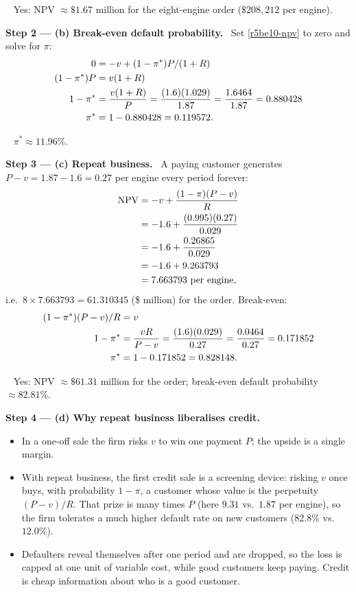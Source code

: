 \documentclass[11pt,a4paper]{article}
\newcommand{\step}[2]{\par\medskip\noindent\textbf{Step #1 --- #2.}~}
\newcommand{\answer}[1]{\par\smallskip\noindent\fbox{\textbf{Answer #1.}}~}
\begin{document}
\answer{(a)} Yes: NPV $\approx \$1.67$ million for the eight-engine order ($\$208{,}212$ per engine).

\step{2}{(b) Break-even default probability}
Set \eqref{r5be10-npv} to zero and solve for $\pi$:
\begin{align}
  0 &= -v + (1-\pi^*)P/(1+R) \notag\\
  (1-\pi^*)P &= v(1+R) \notag\\
  1-\pi^* &= \frac{v(1+R)}{P} = \frac{(1.6)(1.029)}{1.87} = \frac{1.6464}{1.87} = 0.880428 \notag\\
  \pi^* &= 1 - 0.880428 = 0.119572. \label{r5be10-pib}
\end{align}

\answer{(b)} $\pi^* \approx 11.96\%$.

\step{3}{(c) Repeat business}
A paying customer generates $P - v = 1.87 - 1.6 = 0.27$ per engine every period forever:
\begin{align}
  \text{NPV} &= -v + \frac{(1-\pi)(P-v)}{R} \label{r5be10-npvc}\\
  &= -1.6 + \frac{(0.995)(0.27)}{0.029} \notag\\
  &= -1.6 + \frac{0.26865}{0.029} \notag\\
  &= -1.6 + 9.263793 \notag\\
  &= 7.663793 \ \text{per engine}, \notag
\end{align}
i.e.\ $8 \times 7.663793 = 61.310345$ (\$ million) for the order. Break-even:
\begin{align}
  (1-\pi^*)(P - v)/R &= v \notag\\
  1-\pi^* &= \frac{vR}{P - v} = \frac{(1.6)(0.029)}{0.27} = \frac{0.0464}{0.27} = 0.171852 \notag\\
  \pi^* &= 1 - 0.171852 = 0.828148. \label{r5be10-pic}
\end{align}

\answer{(c)} Yes: NPV $\approx \$61.31$ million for the order; break-even default probability $\approx 82.81\%$.

\step{4}{(d) Why repeat business liberalises credit}
\begin{itemize}
  \item In a one-off sale the firm risks $v$ to win one payment $P$; the upside is a single margin.
  \item With repeat business, the first credit sale is a screening device: risking $v$ once buys,
        with probability $1-\pi$, a customer whose value is the perpetuity $(P - v)/R$. That prize
        is many times $P$ (here $9.31$ vs.\ $1.87$ per engine), so the firm tolerates a much higher
        default rate on new customers ($82.8\%$ vs.\ $12.0\%$).
  \item Defaulters reveal themselves after one period and are dropped, so the loss is capped at
        one unit of variable cost, while good customers keep paying. Credit is cheap
        information about who is a good customer.
\end{itemize}
\end{document}

